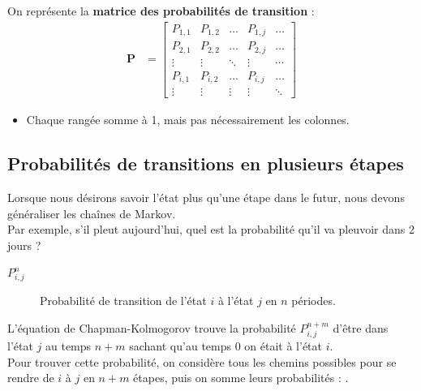 \documentclass[10pt, french]{article}
\begin{document}
\begin{multicols*}{2}
On représente la \textbf{matrice des probabilités de transition}  : 
\begin{align*}
	\bm{P}
	&=	\begin{bmatrix}
		P_{1, 1}	&	P_{1, 2}	&	\dots	&	P_{1, j}		&	\dots	\\
		P_{2, 1}	&	P_{2, 2}	&	\dots	&	P_{2, j}		&	\dots	\\
		\vdots	&	\vdots	&	\ddots	&	\vdots		&	\cdots	\\
		P_{i, 1}	&	P_{i, 2}	&	\dots	&	P_{i, j}		&	\dots	\\
		\vdots	&	\vdots	&	\vdots	&	\vdots		&	\ddots	
		\end{bmatrix}
\end{align*}
\begin{itemize}
	\item	Chaque rangée somme à 1, mais pas nécessairement les colonnes.
\end{itemize}


\columnbreak
\subsection{Probabilités de transitions en plusieurs étapes}
\begin{rappel_enhanced}[Contexte]
Lorsque nous désirons savoir l'état plus qu'une étape dans le futur, nous devons généraliser les chaînes de Markov. \\

Par exemple, s'il pleut aujourd'hui, quel est la probabilité qu'il va pleuvoir dans 2 jours ? 
\end{rappel_enhanced}

\begin{distributions}[Notation]
\begin{description}
	\item[$P_{i, j}^{n}$]	Probabilité de transition de l'état $i$ à l'état $j$ en $n$ périodes.
\end{description}
\end{distributions}

\begin{definitionNOHFILLprop}
L'équation de Chapman-Kolmogorov trouve la probabilité $P_{i, j}^{n + m}$ d'être dans l'état $j$ au temps $n + m$ sachant qu'au temps $0$ on était à l'état $i$.	\\

Pour trouver cette probabilité, on considère tous les chemins possibles pour se rendre de $i$ à $j$ en $n + m$ étapes, puis on somme leurs probabilités : .	\\


\end{definitionNOHFILLprop}
\end{multicols*}
\end{document}
